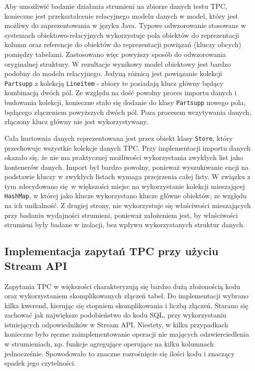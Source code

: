 \documentclass[12pt,twoside,openright]{extarticle}
\begin{document}
    Aby umożliwić badanie działania strumieni na zbiorze danych testu TPC, konieczne jest przekształcenie relacyjnego modelu danych w model, który jest możliwy do zaprezentowania w języku Java. Typowe odwzorowanie stosowane w systemach obiektowo-relacyjnych wykorzystuje pola obiektów do reprezentacji kolumn oraz referencje do obiektów do reprezentacji powiązań (kluczy obcych) pomiędzy tabelami. Zastosowano więc powyższy sposób do odwzorowania oryginalnej struktury. W rezultacje wynikowy model obiektowy jest bardzo podobny do modelu relacyjnego. Jedyną różnicą jest powiązanie kolekcji \texttt{Partsupp} z kolekcją \texttt{Lineitem} - zbiory te posiadają klucz główny będący kombinacją dwóch pól. Ze względu na dość powolny proces importu danych i budowania kolekcji, konieczne stało się dodanie do klasy \texttt{Partsupp} nowego pola, będącego złączeniem powyższych dwóch pól. Poza procesem wczytywania danych, złączony klucz główny nie jest wykorzystywany.

    Cała hurtownia danych reprezentowana jest przez obiekt klasy \texttt{Store}, który przechowuje wszystkie kolekcje danych TPC. Przy implementacji importu danych okazało się, że nie ma praktycznej możliwości wykorzystania zwykłych list jako kontenerów danych. Import był bardzo powolny, ponieważ wyszukiwanie encji na podstawie kluczy w zwykłych listach wymaga przejrzenia całej listy. W związku z tym zdecydowano się w większości miejsc na wykorzystanie kolekcji mieszającej \texttt{HashMap}, w której jako klucze wykorzystano klucze główne obiektów, ze względu na ich unikalność. Z drugiej strony, nie wykorzystuje się właściwości mieszających przy badaniu wydajności strumieni, ponieważ założeniem jest, by właściwości strumieni były badane w izolacji, bez wpływu wykorzystanych struktur danych.


\subsection{Implementacja zapytań TPC przy użyciu Stream API}

Zapytania TPC w większości charakteryzują się bardzo dużą złożonością kodu oraz wykorzystaniem skomplikowanych złączeń tabel. Do implementacji wybrano kilka kwerend, kierując się stopniem skomplikowania i liczbą złączeń. Starano się zachować jak największe podobieństwo do kodu SQL, przy wykorzystaniu istniejących odpowiedników w Stream API. Niestety, w kilku przypadkach konieczne było ręczne zaimplementowanie operacji nie mających odzwierciedlenia w strumieniach, np. funkcje agregujące operujące na kilku kolumnach jednocześnie. Spowodowało to znaczne rozrośnięcie się ilości kodu i znaczący spadek jego czytelności. 
\end{document}
